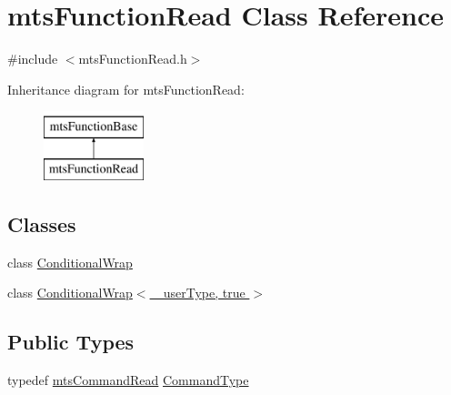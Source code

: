 \hypertarget{classmts_function_read}{}\section{mts\+Function\+Read Class Reference}
\label{classmts_function_read}


{\ttfamily \#include $<$mts\+Function\+Read.\+h$>$}

Inheritance diagram for mts\+Function\+Read\+:\begin{figure}[H]
\begin{center}
\leavevmode
\includegraphics[height=2.000000cm]{db/d23/classmts_function_read}
\end{center}
\end{figure}
\subsection*{Classes}
\begin{DoxyCompactItemize}
\item 
class \hyperlink{classmts_function_read_1_1_conditional_wrap}{Conditional\+Wrap}
\item 
class \hyperlink{classmts_function_read_1_1_conditional_wrap_3_01__user_type_00_01true_01_4}{Conditional\+Wrap$<$ \+\_\+user\+Type, true $>$}
\end{DoxyCompactItemize}
\subsection*{Public Types}
\begin{DoxyCompactItemize}
\item 
typedef \hyperlink{classmts_command_read}{mts\+Command\+Read} \hyperlink{classmts_function_read_ac29fb3db043f94da5d51fe37860b1015}{Command\+Type}
\end{DoxyCompactItemize}
